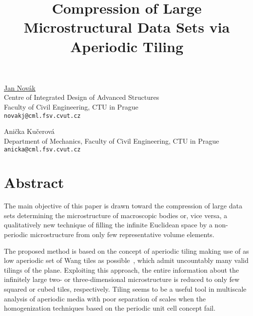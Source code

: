 \title{Compression of Large Microstructural Data Sets via Aperiodic Tiling}
\author{} \institute{}
\maketitle

\begin{center}
{\large \underline{Jan Nov\'{a}k}}\\
Centre of Integrated Design of Advanced Structures\\
Faculty of Civil Engineering, CTU in Prague\\
{\tt novakj@cml.fsv.cvut.cz}\\
\vspace{4mm}

{\large Ani\v{c}ka Ku\v{c}erov\'{a}}\\
Department of Mechanics, Faculty of Civil Engineering, CTU in Prague\\
{\tt anicka@cml.fsv.cvut.cz}
\end{center}

\section*{Abstract}
The main objective of this paper is drawn toward the compression of large data sets determining the microstructure of macroscopic bodies or, vice versa, a qualitatively new technique of filling the infinite Euclidean space by a non-periodic microstructure from only few representative volume elements.

The proposed method is based on the concept of aperiodic tiling making use of as low aperiodic set of Wang tiles as possible~\cite{Cohen:2003:WTI:1201775.882265,Culik96}, which admit uncountably many valid tilings of the plane. Exploiting this approach, the entire information about the infinitely large two- or three-dimensional microstructure is reduced to only few squared or cubed tiles, respectively. Tiling seems to be a useful tool in multiscale analysis of aperiodic media with poor separation of scales when the homogenization techniques based on the periodic unit cell concept fail.

